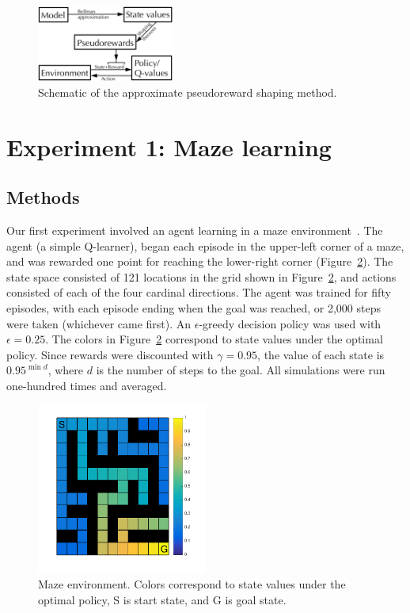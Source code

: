 \documentclass[letterpaper]{article}
\begin{document}
\begin{figure}[ht]
\centering
\includegraphics[width=0.4\textwidth]{approxPR_schematic}
\caption{Schematic of the approximate pseudoreward shaping method.}
\label{fig:approxPR_schematic}
\end{figure}

\section{Experiment 1: Maze learning}

\subsection{Methods}

Our first experiment involved an agent learning in a maze environment~\cite{sutton1991dyna, sutton1991planning, peng1993efficient, sutton1998reinforcement, wiering2012reinforcement}. The agent (a simple Q-learner), began each episode in the upper-left corner of a maze, and was rewarded one point for reaching the lower-right corner (Figure~\ref{fig:maze_values}). The state space consisted of 121 locations in the grid shown in Figure~\ref{fig:maze_values}, and actions consisted of each of the four cardinal directions. The agent was trained for fifty episodes, with each episode ending when the goal was reached, or 2,000 steps were taken (whichever came first). An $\epsilon$-greedy decision policy was used with $\epsilon = 0.25$. The colors in Figure~\ref{fig:maze_values} correspond to state values under the optimal policy. Since rewards were discounted with $\gamma = 0.95$, the value of each state is $0.95^{\min{d}}$, where $d$ is the number of steps to the goal. All simulations were run one-hundred times and averaged.

\begin{figure}[ht]
\centering
\includegraphics[width=0.5\textwidth]{maze_values}
\caption{Maze environment. Colors correspond to state values under the optimal policy, S is start state, and G is goal state.}
\label{fig:maze_values}
\end{figure}
\end{document}
